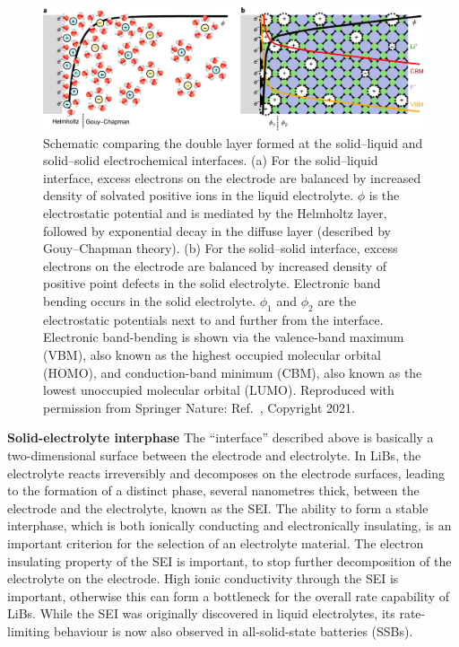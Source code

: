 \documentclass[../main.tex]{subfiles}
\begin{document}
\begin{figure}
    \centering
    \includegraphics[scale=0.35]{figures/edl.jpg}
    \caption{Schematic comparing the double layer formed at the solid–liquid and solid–solid electrochemical interfaces. (a) For the solid–liquid interface, excess electrons on the electrode are balanced by increased density of solvated positive ions in the liquid electrolyte. $\phi$ is the electrostatic potential and is mediated by the Helmholtz layer, followed by exponential decay in the diffuse layer (described by Gouy–Chapman theory). (b) For the solid–solid interface, excess electrons on the electrode are balanced by increased density of positive point defects in the solid electrolyte. Electronic band bending occurs in the solid electrolyte. $\phi_1$ and $\phi_2$ are the electrostatic potentials next to and further from the interface. Electronic band-bending is shown via the valence-band maximum (VBM), also known as the highest occupied molecular orbital (HOMO), and conduction-band minimum (CBM), also known as the lowest unoccupied molecular orbital (LUMO). Reproduced with permission from Springer Nature: Ref.~, Copyright 2021.}
    \label{fig:edl}
\end{figure}

\textbf{Solid-electrolyte interphase} The ``interface'' described above is basically a two-dimensional surface between the electrode and electrolyte. In LiBs, the electrolyte reacts irreversibly and decomposes on the electrode surfaces, leading to the formation of a distinct phase, several nanometres thick, between the electrode and the electrolyte, known as the SEI.\cite{Xu2011} The ability to form a stable interphase, which is both ionically conducting and electronically insulating, is an important criterion for the selection of an electrolyte material. The electron insulating property of the SEI is important, to stop further decomposition of the electrolyte on the electrode.\cite{Xu2004,Goodenough2010} High ionic conductivity through the SEI is important, otherwise this can form a bottleneck for the overall rate capability of LiBs.\cite{Wang2018, Xu2014} While the SEI was originally discovered in liquid electrolytes, its rate-limiting behaviour is now also observed in all-solid-state batteries (SSBs).\cite{Yu2017}
\end{document}
